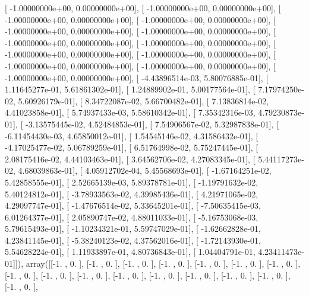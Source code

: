 \documentclass{article}
\begin{document}
       [ -1.00000000e+00,   0.00000000e+00],
       [ -1.00000000e+00,   0.00000000e+00],
       [ -1.00000000e+00,   0.00000000e+00],
       [ -1.00000000e+00,   0.00000000e+00],
       [ -1.00000000e+00,   0.00000000e+00],
       [ -1.00000000e+00,   0.00000000e+00],
       [ -1.00000000e+00,   0.00000000e+00],
       [ -1.00000000e+00,   0.00000000e+00],
       [ -1.00000000e+00,   0.00000000e+00],
       [ -1.00000000e+00,   0.00000000e+00],
       [ -1.00000000e+00,   0.00000000e+00],
       [ -1.00000000e+00,   0.00000000e+00],
       [ -1.00000000e+00,   0.00000000e+00],
       [ -4.43896514e-03,   5.80076885e-01],
       [  1.11645277e-01,   5.61861302e-01],
       [  1.24889902e-01,   5.00177564e-01],
       [  7.17974250e-02,   5.60926179e-01],
       [  8.34722087e-02,   5.66700482e-01],
       [  7.13836814e-02,   4.41023858e-01],
       [  5.74937433e-03,   5.58610342e-01],
       [  7.35342316e-03,   4.79230873e-01],
       [ -3.13575445e-02,   4.52484853e-01],
       [  7.54906567e-02,   5.32987838e-01],
       [ -6.11454430e-03,   4.65850012e-01],
       [  1.54545146e-02,   4.31586432e-01],
       [ -4.17025477e-02,   5.06789259e-01],
       [  6.51764998e-02,   5.75247445e-01],
       [  2.08175416e-02,   4.44103463e-01],
       [  3.64562706e-02,   4.27083345e-01],
       [  5.44117273e-02,   4.68039863e-01],
       [  4.05912702e-04,   5.45568693e-01],
       [ -1.67164251e-02,   5.42858555e-01],
       [  2.52665139e-03,   5.89378781e-01],
       [ -1.19791632e-02,   5.40124812e-01],
       [ -3.78933563e-02,   4.39985436e-01],
       [  4.21971065e-02,   4.29097747e-01],
       [ -1.47676514e-02,   5.33645201e-01],
       [ -7.50635415e-03,   6.01264377e-01],
       [  2.05890747e-02,   4.88011033e-01],
       [ -5.16753068e-03,   5.79615493e-01],
       [ -1.10234321e-01,   5.59747029e-01],
       [ -1.62662828e-01,   4.23841145e-01],
       [ -5.38240123e-02,   4.37562016e-01],
       [ -1.72143930e-01,   5.54628224e-01],
       [  1.11933897e-01,   4.80736843e-01],
       [  1.04404791e-01,   4.23411473e-01]]), array([[-1.        ,  0.        ],
       [-1.        ,  0.        ],
       [-1.        ,  0.        ],
       [-1.        ,  0.        ],
       [-1.        ,  0.        ],
       [-1.        ,  0.        ],
       [-1.        ,  0.        ],
       [-1.        ,  0.        ],
       [-1.        ,  0.        ],
       [-1.        ,  0.        ],
       [-1.        ,  0.        ],
       [-1.        ,  0.        ],
       [-1.        ,  0.        ],
       [-1.        ,  0.        ],
       [-1.        ,  0.        ],
       [-1.        ,  0.        ],
\end{document}

